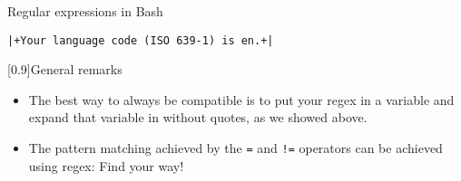 \begin{frame}[fragile]{Regular expressions in Bash}
\begin{onlyenv}
\begin{lstlisting}[style=MyBash, style=oddnumbers, style=smaller]
            |+Your language code (ISO 639-1) is en.+|
        \end{lstlisting}
        \begin{varblock*}{}[0.9\textwidth]{General remarks}
            \begin{itemize}
                \item The best way to always be compatible is to put your regex in a variable and expand that variable in \bash{[[} without quotes, as we showed above.
                \item The pattern matching achieved by the \texttt{=} and \texttt{!=} operators can be achieved using regex: \alert{Find your way!}
            \end{itemize}
        \end{varblock*}
    \end{onlyenv}
\end{frame}











